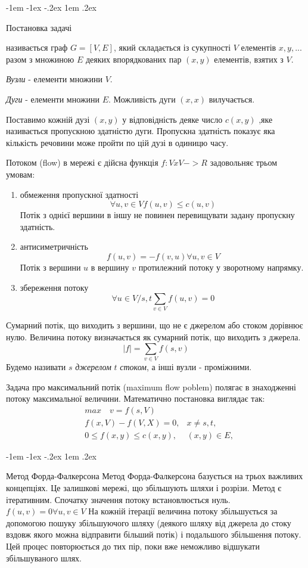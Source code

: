 \documentclass[a4paper,14pt,russian,ukrainian,oneside,final]{extreport}
\makeatletter
\newlength{\fivecharsapprox}
\renewcommand\subsection{%
  \@startsection{subsection}{2}%
    {\fivecharsapprox}%
    {-1em \@plus -1ex \@minus -.2ex}%
    {1em \@plus .2ex}%
    {\raggedright\hyphenpenalty=10000\normalfont\normalsize\bfseries}}
\makeatother
\begin{document}
\subsection{Постановка задачі}

називається граф $G = [V, E]$, який складається із сукупності $V$ елементів $x, y, ...$ разом з множиною $E$ деяких впорядкованих пар $(x, y)$ елементів, взятих з $V$.

{\it Вузли} - елементи множини $V$.
	
{\it Дуги} - елементи множини $E$. Можливість дуги $(x,x)$ вилучається.

Поставимо кожній дузі $(x, y)$ у відповідність деяке число $c (x, y)$ ,яке називається пропускною здатністю дуги. Пропускна здатність показує яка кількість речовини може пройти по цій дузі в одиницю часу. 

Потоком (flow) в мережі є дійсна функція $f: VxV-> R$ задовольняє трьом умовам:
\begin{enumerate}
\item обмеження пропускної здатності $$\forall u,v \in V f(u,v)\leqslant c(u,v)$$
Потік з однієї вершини в іншу не повинен перевищувати задану пропускну здатність.
\item антисиметричність $$f(u,v)=-f(v,u) \forall u,v \in V$$
Потік з вершини $u$ в вершину $v$ протилежний потоку у зворотному напрямку.
\item збереження потоку $$\forall u \in V/s,t \sum_{v\in V} f(u,v)=0$$
\end{enumerate}
Сумарний потік, що виходить з вершини, що не є джерелом або стоком дорівнює нулю. Величина потоку визначається як сумарний потік, що виходить з джерела.
$$|f|=\sum_{v\in V}f(s,v)$$
Будемо називати $s$ {\it джерелом} $t$ {\it стоком}, а інші вузли - проміжними.

Задача про максимальний потік (maximum flow poblem) полягає в знаходженні потоку максимальної величини. Математично постановка виглядає так:
$$
\begin{aligned}
&max\quad  v=f(s,V)& \\
&f(x,V)-f(V,X)=0, &x\neq s,t, \\
&0\leqslant f(x,y) \leqslant c(x,y) , &(x,y)\in E,
\end{aligned} 
$$

\subsection{Метод Форда-Фалкерсона}
Метод Форда-Фалкерсона базується на трьох важливих концепціях. Це залишкові мережі, що збільшують шляхи і розрізи. 
Метод є ітеративним. Спочатку значення потоку  встановлюється нуль. $f(u,v)=0  \forall u,v \in V$ На кожній ітерації величина потоку збільшується 
за допомогою пошуку збільшуючого шляху (деякого шляху від джерела до стоку вздовж якого можна відправити більший потік) і подальшого збільшення потоку. 
Цей процес повторюється до тих пір, поки вже неможливо відшукати збільшуваного шлях.
\end{document}
